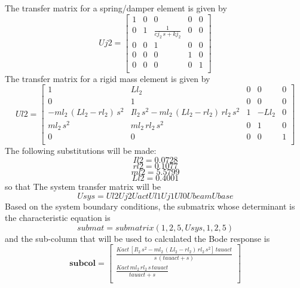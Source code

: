 \documentclass[12pt]{article}
\newcommand{\M}[1]{\mathbf{#1}}
\begin{document}
The transfer matrix for a spring/damper element is given by
\begin{equation}
Uj2= \left[ \begin{array}{ccccc}1&0&0&0&0\\ 0&1& \displaystyle \frac{1}{cj_2\,s+kj_2}&0&0\\ 0&0&1&0&0 \\ 0&0&0&1&0\\ 0&0&0&0&1\\ \end{array} \right] 
\end{equation}
The transfer matrix for a rigid mass element is given by
\begin{equation}
Ul2= \left[ \begin{array}{ccccc}1&Ll_2&0&0&0\\ 0&1&0&0&0\\ -ml_2\,\left(Ll_2-rl_2\right) \,s^2&Il_2\,s^2-ml_2\,\left(Ll_2-rl_2\right)\,rl_2\,s^2&1&-Ll_2&0 \\ ml_2\,s^2&ml_2\,rl_2\,s^2&0&1&0\\ 0&0&0&0&1\\ \end{array} \right] 
\end{equation}
The following substitutions will be made:
\begin{equation}
	Il2=0.0728
\end{equation}
\begin{equation}
	rl2=0.1077
\end{equation}
\begin{equation}
	ml2=5.5799
\end{equation}
\begin{equation}
	Ll2=0.4001
\end{equation}
so that
The system transfer matrix will be
\begin{equation}
	Usys=Ul2 Uj2 Uact Ul1 Uj1 Ul0 Ubeam Ubase
\end{equation}
Based on the system boundary conditions, the submatrix whose determinant is the characteristic equation is
\begin{equation}
	submat=submatrix(1,2,5,Usys,1,2,5)
\end{equation}
and the sub-column that will be used to calculated the Bode response is
\begin{equation}
\M{subcol}= \left[ \begin{array}{c} \displaystyle \frac{Kact\,\left[Il_2\,s^2-ml_2\,\left(Ll_2-rl_2\right)\,rl_2 \,s^2\right]\,tauact}{s\,\left(tauact+s\right)}\\  \displaystyle \frac{Kact\, ml_2\,rl_2\,s\,tauact}{tauact+s}\\ \end{array} \right] 
\end{equation}
\end{document}
